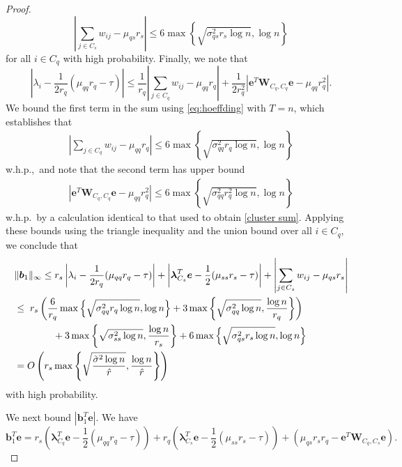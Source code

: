 \documentclass[twoside,11pt]{article}
\newcommand{\bs}{\boldsymbol}
\newcommand{\0}{\bs{0}}
\newcommand{\abs}[1]{\ensuremath{\left| #1  \right| }}
\newcommand{\rbra}[1]{\ensuremath{\left( #1 \right)}} %
\newcommand{\bra}[1]{\ensuremath{\left\{ #1 \right\}}} %
\begin{document}
{\begin{proof}
\begin{equation}
	\abs{ \sum_{j\in C_s} w_{ij} - \mu_{qs} r_s }
		\le 6 \max \bra{ \sqrt{\sigma^2_{qs} r_s \log n}, \log n }
\end{equation}
for all $i \in C_q$ with high probability.
Finally, we note that
\begin{equation}
\label{eq:temp3}
\left|\lambda_i - \frac{1}{2r_q}(\mu_{qq} r_q - \tau)\right| \leq \frac{1}{r_q}\left|\sum_{j \in C_q} w_{ij} - \mu_{qq} r_q \right| + \frac{1}{2r_q^2}\left|\bs{e}^T \bs{W}_{C_q,C_q} \bs{e} - \mu_{qq} r_q^2\right|.
\end{equation}
We bound the first term in the sum using \eqref{eq:hoeffding} with $T=n$,
which establishes that
\begin{align*}
 \left|\sum_{j \in C_q} w_{ij}- \mu_{qq} r_q\right|
 	\le 6 \max \bra{ \sqrt{\sigma^2_{qq} r_q \log n}, \log n }
\end{align*}
w.h.p.,~and note that the second term has upper bound
\begin{align*}
 \left| \bs{e}^T \bs{W}_{C_q,C_q} \bs{e} - \mu_{qq} r_q^2 \right|
\le 6 \max \bra{\sqrt{\sigma_{qq}^2 r_q^2 \log n}, \log n }
\end{align*}
w.h.p.~by a calculation identical to that used to obtain \eqref{cluster sum}.
Applying these bounds using the triangle inequality and the
union bound over all $i \in C_q$, we conclude that
\begin{align}
&\|\bs{b}_1\|_{\infty} \leq r_s \left|\lambda_i -\frac{1}{2r_q}(\mu_{qq} r_q - \tau)\right|
+ \left|\bs{\lambda}_{C_s}^T\bs{e} - \frac{1}{2}(\mu_{ss} r_s - \tau)\right| + \left|\sum_{j \in C_s} w_{ij} - \mu_{qs} r_s\right| \notag\\
 & \leq  \;r_s \left(\frac{6}{r_q}\max \bra{ \sqrt{\sigma^2_{qq} r_q \log n}, \log n } + 3 \max\bra{ \sqrt{\sigma_{qq}^2  \log n}, \frac{\log n}{r_q}} \right) \notag \\
& \hspace{0.55in} + 3  \max\bra{ \sqrt{\sigma_{ss}^2  \log n}, \frac{\log n}{r_s}}
+ 6 \max\bra{ \sqrt{\sigma_{qs}^2  r_s \log n}, \log n}  \notag\\
 & =  O \rbra{ r_s \max \bra{  \sqrt{ \frac{ \tilde{\sigma}^2 \log n}{\hat{r}} }, \frac{ \log n}{\hat{r}} } } \label{eq:b1_inf_orig}
\end{align}
with high probability.

We next bound $\left|\bs{b}_1^T \bs{e}\right|$. We have
$$ \bs{b}_1^T \bs{e} = r_s \left(\bs{\lambda}_{C_q}^T \bs{e} - \frac{1}{2}\left(\mu_{qq} r_q - \tau\right)\right) + r_q \left(\bs{\lambda}_{C_s}^T \bs{e} - \frac{1}{2}\left(\mu_{ss} r_s - \tau\right)\right) + \left(\mu_{qs} r_s r_q - \bs{e}^T \bs{W}_{C_q,C_s}\bs{e}\right).$$



\end{proof}}
\end{document}

